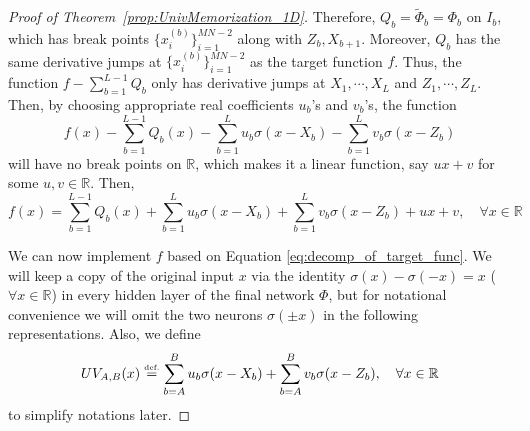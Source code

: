 \documentclass{article}
\numberwithin{equation}{section}
\theoremstyle{definition}
\newcommand{\eqdef}{\ensuremath{\stackrel{\mbox{\upshape\tiny def.}}{=}}}
\begin{document}
\begin{proof}[{Proof of Theorem~\ref{prop:UnivMemorization_1D}}]
Therefore, $Q_b = \tilde{\Phi}_b = \Phi_b$ on $I_b$, which has break points $\big\{x_i^{(b)}\big\}_{i=1}^{MN-2}$ along with $Z_b, X_{b+1}$. Moreover, $Q_b$ has the same derivative jumps at $\big\{x_i^{(b)}\big\}_{i=1}^{MN-2}$ as the target function $f$. Thus, the function $f - \sum_{b=1}^{L-1} Q_b$ only has derivative jumps at $X_1,\cdots,X_{L}$ and $Z_1,\cdots,Z_{L}$. Then, by choosing appropriate real coefficients $u_b$'s and $v_b$'s, the function
\[
    f(x) - 
    \sum_{b=1}^{L-1} Q_b(x)
    -
    \sum_{b=1}^{L} u_b \sigma(x-X_b)
    -
    \sum_{b=1}^{L} v_b \sigma(x-Z_b)
\]
will have no break points on $\mathbb{R}$, which makes it a linear function, say $ux+v$ for some $u,v\in\mathbb{R}$. Then, 
\begin{equation}
\label{eq:decomp_of_target_func}
    f(x)
    =
    \sum_{b=1}^{L-1} Q_b(x)
    +
    \sum_{b=1}^{L} u_b \sigma(x-X_b)
    +
    \sum_{b=1}^{L} v_b \sigma(x-Z_b)
    +
    ux
    +
    v,
    \quad \forall x \in \mathbb{R}
\end{equation}

We can now implement $f$ based on Equation \ref{eq:decomp_of_target_func}. 
We will keep a copy of the original input $x$ via the identity $\sigma(x) - \sigma(-x) = x$ ($\forall x\in\mathbb{R}$) in every hidden layer of the final network $\Phi$, but for notational convenience we will omit the two neurons $\sigma(\pm x)$ in the following representations. Also, we define 
\[
    UV_{A,B}(x) 
    \eqdef 
    \sum_{b=A}^{B} u_b \sigma(x-X_b)
    +
    \sum_{b=A}^{B} v_b \sigma(x-Z_b),
    \quad \forall x \in \mathbb{R}
\]
to simplify notations later.


\end{proof}
\end{document}
